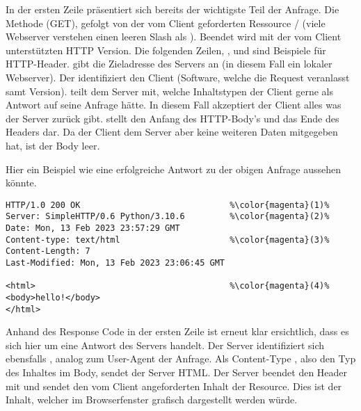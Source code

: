 In der ersten Zeile  präsentiert sich bereits der wichtigste Teil der Anfrage. Die Methode (GET), gefolgt von der vom Client geforderten Ressource \frqq{}/\flqq{} (viele Webserver verstehen einen leeren Slash als ). Beendet wird  mit der vom Client unterstützten HTTP Version. Die folgenden Zeilen, ,  und  sind Beispiele für HTTP-Header.  gibt die Zieladresse des Servers an (in diesem Fall ein lokaler Webserver). Der  identifiziert den Client (Software, welche die Request veranlasst samt Version).  teilt dem Server mit, welche Inhaltstypen der Client gerne als Antwort auf seine Anfrage hätte. In diesem Fall akzeptiert der Client alles was der Server zurück gibt.  stellt den Anfang des HTTP-Body's und das Ende des Headers dar. Da der Client dem Server aber keine weiteren Daten mitgegeben hat, ist der Body leer.\bigskip

\noindent
Hier ein Beispiel wie eine erfolgreiche Antwort zu der obigen Anfrage aussehen könnte.
\begin{lstlisting}[style=goMono,caption={Bespiel 2: Erfolgreiche Anwort},label={lst:http:ex2}]
HTTP/1.0 200 OK                              %\color{magenta}(1)%
Server: SimpleHTTP/0.6 Python/3.10.6         %\color{magenta}(2)%
Date: Mon, 13 Feb 2023 23:57:29 GMT
Content-type: text/html                      %\color{magenta}(3)%
Content-Length: 7
Last-Modified: Mon, 13 Feb 2023 23:06:45 GMT
                                            
<html>                                       %\color{magenta}(4)%
<body>hello!</body>
</html>
\end{lstlisting} 
Anhand des Response Code in der ersten Zeile  ist erneut klar ersichtlich, dass es sich hier um eine Antwort des Servers handelt. Der Server identifiziert sich ebensfalls , analog zum User-Agent der Anfrage. Als Content-Type , also den Typ des Inhaltes im Body, sendet der Server HTML. Der Server beendet den Header mit \frqq{}\flqq{} und sendet den vom Client angeforderten Inhalt der \mono{/} Resource. Dies ist der Inhalt, welcher im Browserfenster grafisch dargestellt werden würde. 

